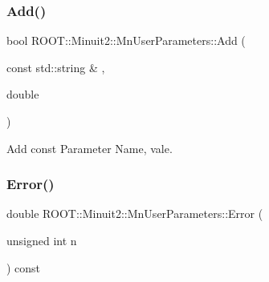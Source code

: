 \subsubsection{\texorpdfstring{Add()}{Add()}\hspace{0.1cm}{\footnotesize\ttfamily [6/6]}}
{\footnotesize\ttfamily bool R\+O\+O\+T\+::\+Minuit2\+::\+Mn\+User\+Parameters\+::\+Add (\begin{DoxyParamCaption}\item[{const std\+::string \&}]{,  }\item[{double}]{ }\end{DoxyParamCaption})}



Add const Parameter Name, vale. 

\mbox{\label{classROOT_1_1Minuit2_1_1MnUserParameters_a08122c2515f2f3505ae14a26f7112dcc}} 
\subsubsection{\texorpdfstring{Error()}{Error()}\hspace{0.1cm}{\footnotesize\ttfamily [1/4]}}
{\footnotesize\ttfamily double R\+O\+O\+T\+::\+Minuit2\+::\+Mn\+User\+Parameters\+::\+Error (\begin{DoxyParamCaption}\item[{unsigned int}]{n }\end{DoxyParamCaption}) const}

